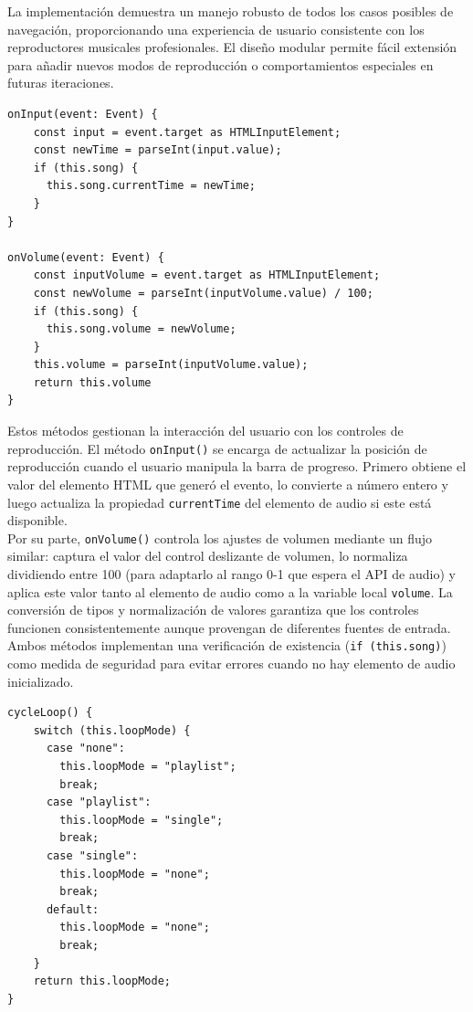 \documentclass[11pt, a4paper]{article}
\begin{document}
                La implementación demuestra un manejo robusto de todos los casos posibles de navegación, proporcionando una experiencia de usuario consistente con los reproductores musicales profesionales. El diseño modular permite fácil extensión para añadir nuevos modos de reproducción o comportamientos especiales en futuras iteraciones. \\

                \begin{lstlisting}[caption={Control de tiempo y volumen}]
onInput(event: Event) {
    const input = event.target as HTMLInputElement;
    const newTime = parseInt(input.value);
    if (this.song) {
      this.song.currentTime = newTime;
    }
}

onVolume(event: Event) {
    const inputVolume = event.target as HTMLInputElement;
    const newVolume = parseInt(inputVolume.value) / 100;
    if (this.song) {
      this.song.volume = newVolume;
    }
    this.volume = parseInt(inputVolume.value);
    return this.volume
}
                \end{lstlisting}

                Estos métodos gestionan la interacción del usuario con los controles de reproducción. El método \verb|onInput()| se encarga de actualizar la posición de reproducción cuando el usuario manipula la barra de progreso. Primero obtiene el valor del elemento HTML que generó el evento, lo convierte a número entero y luego actualiza la propiedad \verb|currentTime| del elemento de audio si este está disponible. \\

                Por su parte, \verb|onVolume()| controla los ajustes de volumen mediante un flujo similar: captura el valor del control deslizante de volumen, lo normaliza dividiendo entre 100 (para adaptarlo al rango 0-1 que espera el API de audio) y aplica este valor tanto al elemento de audio como a la variable local \verb|volume|. La conversión de tipos y normalización de valores garantiza que los controles funcionen consistentemente aunque provengan de diferentes fuentes de entrada. \\

                Ambos métodos implementan una verificación de existencia (\verb|if (this.song)|) como medida de seguridad para evitar errores cuando no hay elemento de audio inicializado.

                \begin{lstlisting}[caption={cycleLoop()}]
cycleLoop() {
    switch (this.loopMode) {
      case "none":
        this.loopMode = "playlist";
        break;
      case "playlist":
        this.loopMode = "single";
        break;
      case "single":
        this.loopMode = "none";
        break;
      default:
        this.loopMode = "none";
        break;
    }
    return this.loopMode;
}
                \end{lstlisting}
\end{document}
